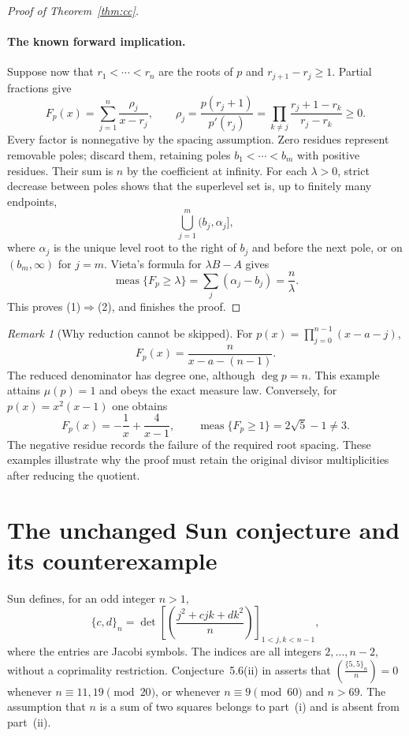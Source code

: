 \documentclass[11pt,a4paper]{article}
\theoremstyle{remark}
\newtheorem{remark}[theorem]{Remark}
\newcommand{\jac}[2]{\left(\frac{#1}{#2}\right)}
\DeclareMathOperator{\meas}{meas}
\begin{document}
\begin{proof}[Proof of Theorem~\ref{thm:cc}]
\paragraph{The known forward implication.}
Suppose now that $r_1<\cdots<r_n$ are the roots of $p$ and
$r_{j+1}-r_j\ge1$. Partial fractions give
\[
 F_p(x)=\sum_{j=1}^n\frac{\rho_j}{x-r_j},\qquad
 \rho_j=\frac{p(r_j+1)}{p'(r_j)}
       =\prod_{k\ne j}\frac{r_j+1-r_k}{r_j-r_k}\ge0.
\]
Every factor is nonnegative by the spacing assumption. Zero residues
represent removable poles; discard them, retaining poles
$b_1<\cdots<b_m$ with positive residues. Their sum is $n$ by the
coefficient at infinity.
For each $\lambda>0$, strict decrease between poles shows that the
superlevel set is, up to finitely many endpoints,
\[
 \bigcup_{j=1}^m(b_j,\alpha_j],
\]
where $\alpha_j$ is the unique level root to the right of $b_j$
and before the next pole, or on $(b_m,\infty)$ for $j=m$.
Vieta's formula for $\lambda B-A$ gives
\[
 \meas\{F_p\ge\lambda\}
 =\sum_j(\alpha_j-b_j)=\frac n\lambda.
\]
This proves (1)$\Rightarrow$(2), and finishes the proof.
\end{proof}

\begin{remark}[Why reduction cannot be skipped]
For $p(x)=\prod_{j=0}^{n-1}(x-a-j)$,
\[
 F_p(x)=\frac{n}{x-a-(n-1)}.
\]
The reduced denominator has degree one, although $\deg p=n$.
This example attains $\mu(p)=1$ and obeys the exact measure law.
Conversely, for $p(x)=x^2(x-1)$ one obtains
\[
 F_p(x)=-\frac1x+\frac4{x-1},\qquad
 \meas\{F_p\ge1\}=2\sqrt5-1\ne3.
\]
The negative residue records the failure of the required root spacing.
These examples illustrate why the proof must retain the original
divisor multiplicities after reducing the quotient.
\end{remark}

\section{The unchanged Sun conjecture and its counterexample}\label{sec:sun-target}

Sun defines, for an odd integer \(n>1\),
\begin{equation}\label{eq:original}
\{c,d\}_n=
\det\!\left[\jac{j^2+cjk+dk^2}{n}\right]_{1<j,k<n-1},
\end{equation}
where the entries are Jacobi symbols. The indices are all integers
\(2,\ldots,n-2\), without a coprimality restriction.
Conjecture~5.6(ii) in \cite[p.~23]{Sun2024} asserts that
\(\jac{\{5,5\}_n}{n}=0\) whenever \(n\equiv11,19\pmod{20}\), or
whenever \(n\equiv9\pmod{60}\) and \(n>69\).
The assumption that \(n\) is a sum of two squares belongs to part~(i)
and is absent from part~(ii).
\end{document}
